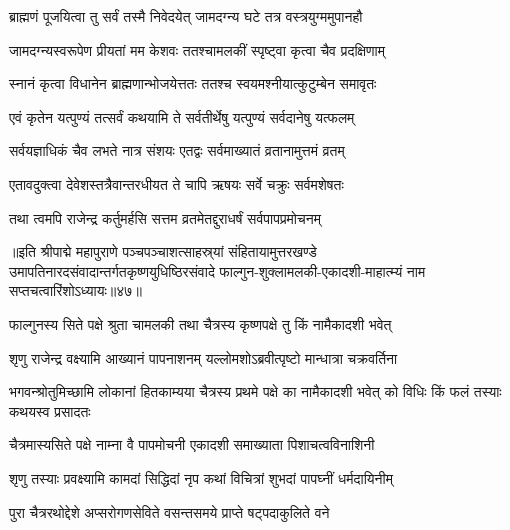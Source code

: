 \twolineshloka
{ब्राह्मणं पूजयित्वा तु सर्वं तस्मै निवेदयेत्}
{जामदग्न्य घटे तत्र वस्त्रयुग्ममुपानहौ}%

\twolineshloka
{जामदग्न्यस्वरूपेण प्रीयतां मम केशवः}
{ततश्चामलकीं स्पृष्ट्वा कृत्वा चैव प्रदक्षिणाम्}%

\twolineshloka
{स्नानं कृत्वा विधानेन ब्राह्मणान्भोजयेत्ततः}
{ततश्च स्वयमश्नीयात्कुटुम्बेन समावृतः}%

\twolineshloka
{एवं कृतेन यत्पुण्यं तत्सर्वं कथयामि ते}
{सर्वतीर्थेषु यत्पुण्यं सर्वदानेषु यत्फलम्}%

\twolineshloka
{सर्वयज्ञाधिकं चैव लभते नात्र संशयः}
{एतद्वः सर्वमाख्यातं व्रतानामुत्तमं व्रतम्}%

\twolineshloka
{एतावदुक्त्वा देवेशस्तत्रैवान्तरधीयत}
{ते चापि ऋषयः सर्वे चक्रुः सर्वमशेषतः}%

\twolineshloka
{तथा त्वमपि राजेन्द्र कर्तुमर्हसि सत्तम}
{व्रतमेतद्दुराधर्षं सर्वपापप्रमोचनम्}%

॥इति श्रीपाद्मे महापुराणे पञ्चपञ्चाशत्साहस्र्यां संहितायामुत्तरखण्डे उमापतिनारदसंवादान्तर्गतकृष्णयुधिष्ठिरसंवादे फाल्गुन-शुक्लामलकी-एकादशी-माहात्म्यं नाम सप्तचत्वारिंशोऽध्यायः॥४७॥


\hyperref[sec:ekadashi_mahatmyam_padma_puranam]{\closesub}
\clearpage

\label{sec:padma-chaitra-krishna-papamochani}



\twolineshloka
{फाल्गुनस्य सिते पक्षे श्रुता चामलकी तथा}
{चैत्रस्य कृष्णपक्षे तु किं नामैकादशी भवेत्}%


\twolineshloka
{शृणु राजेन्द्र वक्ष्यामि आख्यानं पापनाशनम्}
{यल्लोमशोऽब्रवीत्पृष्टो मान्धात्रा चक्रवर्तिना}%


\threelineshloka
{भगवन्श्रोतुमिच्छामि लोकानां हितकाम्यया}
{चैत्रस्य प्रथमे पक्षे का नामैकादशी भवेत्}
{को विधिः किं फलं तस्याः कथयस्व प्रसादतः}%


\twolineshloka
{चैत्रमास्यसिते पक्षे नाम्ना वै पापमोचनी}
{एकादशी समाख्याता पिशाचत्वविनाशिनी}%

\twolineshloka
{शृणु तस्याः प्रवक्ष्यामि कामदां सिद्धिदां नृप}
{कथां विचित्रां शुभदां पापघ्नीं धर्मदायिनीम्}%

\twolineshloka
{पुरा चैत्ररथोद्देशे अप्सरोगणसेविते}
{वसन्तसमये प्राप्ते षट्पदाकुलिते वने}%

